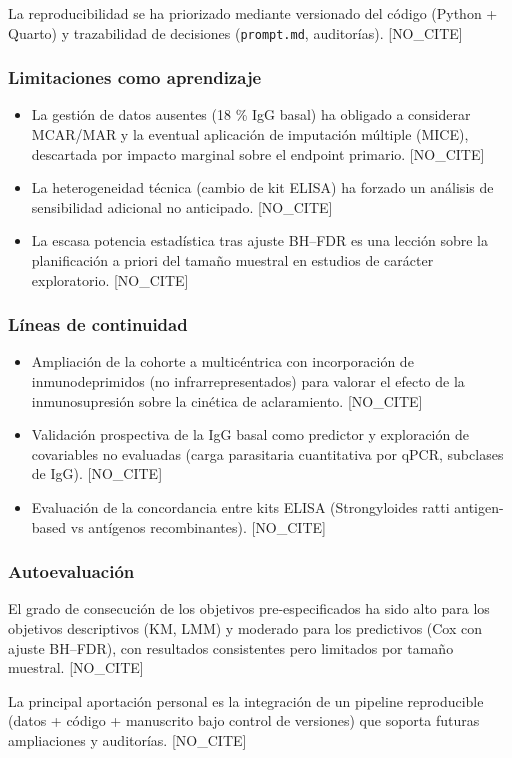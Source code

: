 \documentclass[
  spanish,
  12pt,
  a4paper,
]{article}
\providecommand{\tightlist}{%
  \setlength{\itemsep}{0pt}\setlength{\parskip}{0pt}}
\begin{document}
La reproducibilidad se ha priorizado mediante versionado del código
(Python + Quarto) y trazabilidad de decisiones (\texttt{prompt.md},
auditorías). {[}NO\_CITE{]}

\subsubsection{Limitaciones como
aprendizaje}\label{limitaciones-como-aprendizaje}

\begin{itemize}
\tightlist
\item
  La gestión de datos ausentes (18 \% IgG basal) ha obligado a
  considerar MCAR/MAR y la eventual aplicación de imputación múltiple
  (MICE), descartada por impacto marginal sobre el endpoint primario.
  {[}NO\_CITE{]}
\item
  La heterogeneidad técnica (cambio de kit ELISA) ha forzado un análisis
  de sensibilidad adicional no anticipado. {[}NO\_CITE{]}
\item
  La escasa potencia estadística tras ajuste BH--FDR es una lección
  sobre la planificación a priori del tamaño muestral en estudios de
  carácter exploratorio. {[}NO\_CITE{]}
\end{itemize}

\subsubsection{Líneas de continuidad}\label{luxedneas-de-continuidad}

\begin{itemize}
\tightlist
\item
  Ampliación de la cohorte a multicéntrica con incorporación de
  inmunodeprimidos (no infrarrepresentados) para valorar el efecto de la
  inmunosupresión sobre la cinética de aclaramiento. {[}NO\_CITE{]}
\item
  Validación prospectiva de la IgG basal como predictor y exploración de
  covariables no evaluadas (carga parasitaria cuantitativa por qPCR,
  subclases de IgG). {[}NO\_CITE{]}
\item
  Evaluación de la concordancia entre kits ELISA (Strongyloides ratti
  antigen-based vs antígenos recombinantes). {[}NO\_CITE{]}
\end{itemize}

\subsubsection{Autoevaluación}\label{autoevaluaciuxf3n}

El grado de consecución de los objetivos pre-especificados ha sido alto
para los objetivos descriptivos (KM, LMM) y moderado para los
predictivos (Cox con ajuste BH--FDR), con resultados consistentes pero
limitados por tamaño muestral. {[}NO\_CITE{]}

La principal aportación personal es la integración de un pipeline
reproducible (datos + código + manuscrito bajo control de versiones) que
soporta futuras ampliaciones y auditorías. {[}NO\_CITE{]}
\end{document}

